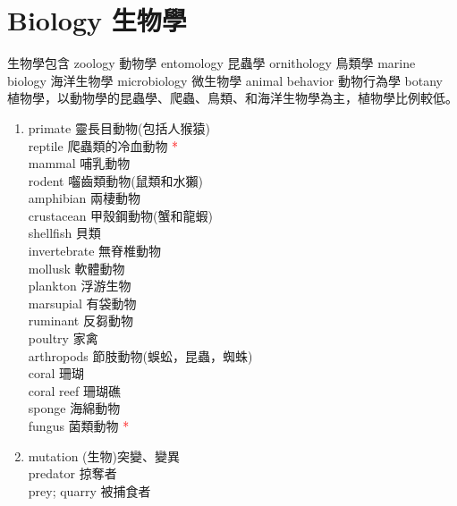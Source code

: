 \documentclass[twoside,b5paper]{book}
\begin{document}
  \chapter{Biology 生物學}
  生物學包含 zoology 動物學 entomology 昆蟲學 ornithology 鳥類學 marine biology 海洋生物學 microbiology 微生物學 animal behavior 動物行為學 botany 植物學，以動物學的昆蟲學、爬蟲、鳥類、和海洋生物學為主，植物學比例較低。
  \begin{enumerate}
    \item
      primate  靈長目動物(包括人猴猿)\\
      reptile  爬蟲類的冷血動物 \textcolor{red}{*}\\
      mammal  哺乳動物\\
      rodent  囓齒類動物(鼠類和水獺)\\
      amphibian  兩棲動物\\
      crustacean  甲殼鋼動物(蟹和龍蝦)\\
      shellfish 貝類\\
      invertebrate 無脊椎動物\\
      mollusk  軟體動物\\
      plankton  浮游生物\\
      marsupial  有袋動物\\
      ruminant  反芻動物\\
      poultry  家禽\\
      arthropods  節肢動物(蜈蚣，昆蟲，蜘蛛)\\
      coral 珊瑚\\
      coral reef 珊瑚礁\\
      sponge 海綿動物\\
      fungus  菌類動物 \textcolor{red}{*}
    \item
      mutation (生物)突變、變異\\
      predator  掠奪者\\
      prey; quarry  被捕食者\\

\end{enumerate}
\end{document}
